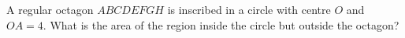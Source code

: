 A regular octagon $ABCDEFGH$ is inscribed in a circle with centre $O$ and $OA=4$. What is the area of the region inside the circle but outside the octagon?

